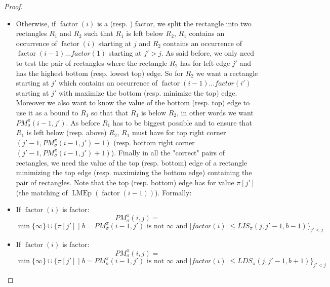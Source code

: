 \documentclass[a4paper]{llncs}
\newcommand{\RLMin}{\text{RLMin}\xspace}
\newcommand{\RLMax}{\text{RLMax}\xspace}
\newcommand{\ptext}{\pi}
\newcommand{\PM}{PM}
\DeclareMathOperator{\LMEi}{LMEp}
\DeclareMathOperator{\factor}{factor}
\begin{document}
\begin{proof}
\begin{itemize}
\item Otherwise, if $\factor(i)$ is a \RLMin (resp. \RLMax) factor,
 we split the rectangle into two rectangles $R_1$ and
$R_2$ such that $R_1$ is left below $R_2$,
$R_1$ contains an occurrence of $\factor(i)$ starting at
$j$
and $R_2$ contains an occurrence of $\factor(i-1) \ldots factor(1)$
starting at $j'>j$.
As said before, we only need to test the pair of rectangles
where the rectangle $R_2$ has for left edge $j'$
and has the highest bottom (resp. lowest top) edge.
So for $R_2$ we want
a rectangle starting at $j'$
which contains an occurrence of $\factor(i-1) \ldots factor(i')$
starting at $j'$
with maximize the bottom (resp. minimize the top) edge.
Moreover we also want to know the value of the bottom (resp. top) edge to use it as a bound to $R_1$ so that
that $R_1$ is below $R_2$,
in other words we want $\PM^\pi_\sigma(i-1,j')$.
As before $R_1$ has to be biggest possible and
to ensure that $R_1$ is left below (resp. above) $R_2$,
$R_1$ must have for top right corner $(j'-1, \PM^\pi_\sigma(i-1,j')-1 )$
(resp. bottom right corner $(j'-1, \PM^\pi_\sigma(i-1,j')+1 )$).
Finally in all the "correct" pairs of rectangles,
we need the value of the top (resp. bottom) edge of a rectangle minimizing the top edge (resp. maximizing the bottom edge)
containing the pair of rectangles. Note that the top (resp. bottom) edge has for value $\pi[j']$
(the matching of  $\LMEi(\factor(i-1))$). Formally:

\item If $\factor(i)$ is \RLMin factor:\\
$$
\PM^\pi_\sigma(i,j) =
$$
$
\min \{\infty\} \cup \{ \pi[j'] \mid b=\PM^\pi_\sigma(i-1,j') \text{ is not $\infty$ and }
 |factor(i)| \leq LIS_{\ptext}(j,j'-1,b-1) \}_{j' < j}
$

\item If $\factor(i)$ is \RLMax factor:\\
$$
\PM^\pi_\sigma(i,j) =
$$
$
\min \{\infty\} \cup \{ \pi[j'] \mid b=\PM^\pi_\sigma(i-1,j') \text{ is not $\infty$ and }
|factor(i)| \leq LDS_{\ptext}(j,j'-1,b+1) \}_{j' < j}
$




\end{itemize}


\end{proof}
\end{document}
